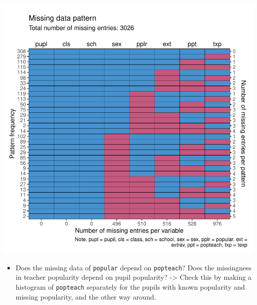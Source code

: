 \documentclass[
]{jss}
\providecommand{\tightlist}{%
  \setlength{\itemsep}{0pt}\setlength{\parskip}{0pt}}
\begin{document}
\begin{CodeChunk}


\begin{center}\includegraphics{Manuscript_files/figure-latex/pop_pat-1} \end{center}

\end{CodeChunk}

\begin{itemize}
\tightlist
\item
  Does the missing data of \texttt{popular} depend on \texttt{popteach}?
  Does the missingness in teacher popularity depend on pupil popularity?
  -\textgreater{} Check this by making a histogram of \texttt{popteach}
  separately for the pupils with known popularity and missing
  popularity, and the other way around.
\end{itemize}
\end{document}
